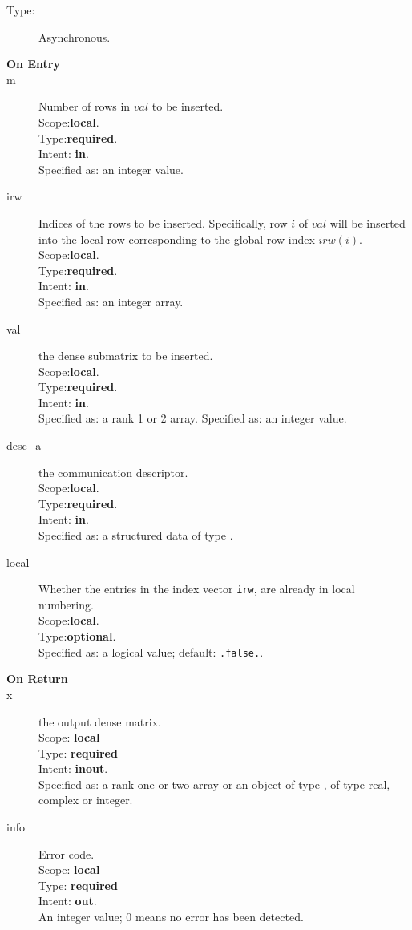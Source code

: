 \begin{description}
\item[Type:] Asynchronous.
\item[\bf On Entry]
\item[m] Number of rows in $val$  to be inserted.\\
Scope:{\bf local}.\\
Type:{\bf required}.\\
Intent: {\bf in}.\\
Specified as: an integer value.
\item[irw] Indices of the rows to be inserted. Specifically, row $i$
  of $val$ will be inserted into the local row corresponding to the
  global row index $irw(i)$.
Scope:{\bf local}.\\
Type:{\bf required}.\\
Intent: {\bf in}.\\
Specified as: an integer array.
\item[val] the dense submatrix to be inserted.\\
Scope:{\bf local}.\\
Type:{\bf required}.\\
Intent: {\bf in}.\\
Specified as: a rank 1 or 2  array.
Specified as: an integer value.
\item[desc\_a] the communication descriptor.\\
Scope:{\bf local}.\\
Type:{\bf required}.\\
Intent: {\bf in}.\\
Specified as: a structured data of type \descdata.
\item[local] Whether the entries in the index vector \verb|irw|,
   are already in local  numbering. \\
 Scope:{\bf local}.\\
 Type:{\bf optional}.\\
 Specified as: a logical value; default: \verb|.false.|.

\end{description}

\begin{description}
\item[\bf On Return]
\item[x] the output dense matrix.\\
Scope: {\bf local} \\
Type: {\bf required}\\
Intent: {\bf inout}.\\
Specified as:  a rank one or two array or an object of type \vdata, of
type real, complex or integer.\\ 
\item[info] Error code.\\
Scope: {\bf local} \\
Type: {\bf required} \\
Intent: {\bf out}.\\
An integer value; 0 means no error has been detected. 
\end{description}


